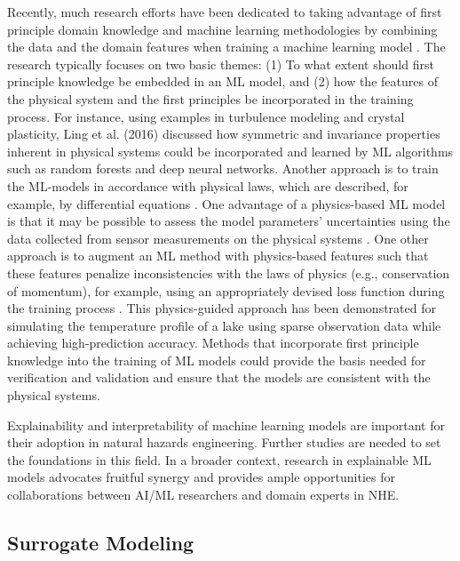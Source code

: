 Recently, much research efforts have been dedicated to taking advantage of first principle domain knowledge and machine learning methodologies by combining the data and the domain features when training a machine learning model \citep{williard2020integrating}. The research typically focuses on two basic themes: (1) To what extent should first principle knowledge be embedded in an ML model, and (2) how the features of the physical system and the first principles be incorporated in the training process. For instance, using examples in turbulence modeling and crystal plasticity, Ling et al. (2016) discussed how symmetric and invariance properties inherent in physical systems could be incorporated and learned by ML algorithms such as random forests and deep neural networks. Another approach is to train the ML-models in accordance with physical laws, which are described, for example, by differential equations \citep{raissi2019physicsinformed}. One advantage of a physics-based ML model is that it may be possible to assess the model parameters' uncertainties using the data collected from sensor measurements on the physical systems \citep{zhang2019quantifying}. One other approach is to augment an ML method with physics-based features such that these features penalize inconsistencies with the laws of physics (e.g., conservation of momentum), for example, using an appropriately devised loss function during the training process \citep{jia2020physicsguided}. This physics-guided approach has been demonstrated for simulating the temperature profile of a lake using sparse observation data while achieving high-prediction accuracy. Methods that incorporate first principle knowledge into the training of ML models could provide the basis needed for verification and validation and ensure that the models are consistent with the physical systems. 

Explainability and interpretability of machine learning models are important for their adoption in natural hazards engineering. Further studies are needed to set the foundations in this field. In a broader context, research in explainable ML models advocates fruitful synergy and provides ample opportunities for collaborations between AI/ML researchers and domain experts in NHE.

\subsection{Surrogate Modeling}

